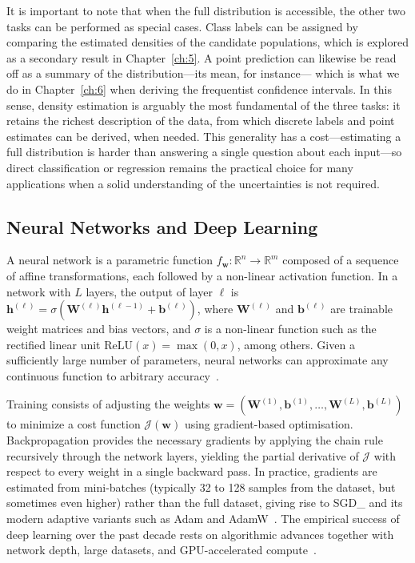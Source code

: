 It is important to note that when the full distribution is accessible, the other two tasks can be performed as special cases.
Class labels can be assigned by comparing the estimated densities of the candidate populations, which is explored as a secondary result in Chapter~\ref{ch:5}.
A point prediction can likewise be read off as a summary of the distribution---its mean, for instance--- which is what we do in Chapter~\ref{ch:6} when deriving the frequentist confidence intervals.
In this sense, density estimation is arguably the most fundamental of the three tasks: it retains the richest description of the data, from which discrete labels and point estimates can be derived, when needed.
This generality has a cost---estimating a full distribution is harder than answering a single question about each input---so direct classification or regression remains the practical choice for many applications when a solid understanding of the uncertainties is not required.

\subsection{Neural Networks and Deep Learning}
\label{sec:3.3.2}

A neural network is a parametric function $f_{\boldsymbol{w}}: \mathbb{R}^n \to \mathbb{R}^m$ composed of a sequence of affine transformations, each followed by a non-linear activation function.
In a network with $L$ layers, the output of layer $\ell$ is $\mathbf{h}^{(\ell)} = \sigma(\mathbf{W}^{(\ell)}\mathbf{h}^{(\ell-1)} + \mathbf{b}^{(\ell)})$, where $\mathbf{W}^{(\ell)}$ and $\mathbf{b}^{(\ell)}$ are trainable weight matrices and bias vectors, and $\sigma$ is a non-linear function such as the rectified linear unit $\mathrm{ReLU}(x) = \max(0, x)$, among others.
Given a sufficiently large number of parameters, neural networks can approximate any continuous function to arbitrary accuracy~\cite{bishop,Goodfellow:2016dlbook}.

Training consists of adjusting the weights $\boldsymbol{w} = (\mathbf{W}^{(1)}, \mathbf{b}^{(1)}, \ldots, \mathbf{W}^{(L)}, \mathbf{b}^{(L)})$ to minimize a cost function $\mathcal{J}(\boldsymbol{w})$ using gradient-based optimisation.
Backpropagation provides the necessary gradients by applying the chain rule recursively through the network layers, yielding the partial derivative of $\mathcal{J}$ with respect to every weight in a single backward pass.
In practice, gradients are estimated from mini-batches (typically 32 to 128 samples from the dataset, but sometimes even higher) rather than the full dataset, giving rise to \gls{SGD_} and its modern adaptive variants such as Adam and AdamW~\cite{Loshchilov:2017bsp}.
The empirical success of deep learning over the past decade rests on algorithmic advances together with network depth, large datasets, and GPU-accelerated compute~\cite{LeCun:2015pmr}.

